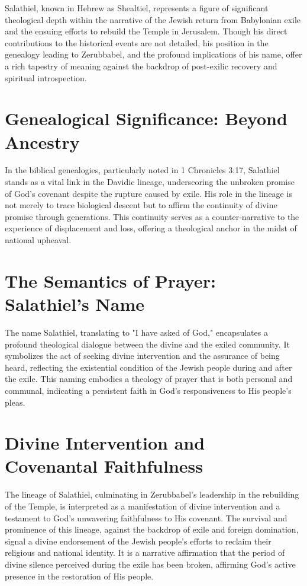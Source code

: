 Salathiel, known in Hebrew as Shealtiel, represents a figure of significant theological depth within the narrative of the Jewish return from Babylonian exile and the ensuing efforts to rebuild the Temple in Jerusalem. Though his direct contributions to the historical events are not detailed, his position in the genealogy leading to Zerubbabel, and the profound implications of his name, offer a rich tapestry of meaning against the backdrop of post-exilic recovery and spiritual introspection.

\chapter{Genealogical Significance: Beyond Ancestry}
In the biblical genealogies, particularly noted in 1 Chronicles 3:17, Salathiel stands as a vital link in the Davidic lineage, underscoring the unbroken promise of God’s covenant despite the rupture caused by exile. His role in the lineage is not merely to trace biological descent but to affirm the continuity of divine promise through generations. This continuity serves as a counter-narrative to the experience of displacement and loss, offering a theological anchor in the midst of national upheaval.

\chapter{The Semantics of Prayer: Salathiel's Name}
The name Salathiel, translating to "I have asked of God," encapsulates a profound theological dialogue between the divine and the exiled community. It symbolizes the act of seeking divine intervention and the assurance of being heard, reflecting the existential condition of the Jewish people during and after the exile. This naming embodies a theology of prayer that is both personal and communal, indicating a persistent faith in God's responsiveness to His people’s pleas.

\chapter{Divine Intervention and Covenantal Faithfulness}
The lineage of Salathiel, culminating in Zerubbabel’s leadership in the rebuilding of the Temple, is interpreted as a manifestation of divine intervention and a testament to God’s unwavering faithfulness to His covenant. The survival and prominence of this lineage, against the backdrop of exile and foreign domination, signal a divine endorsement of the Jewish people’s efforts to reclaim their religious and national identity. It is a narrative affirmation that the period of divine silence perceived during the exile has been broken, affirming God's active presence in the restoration of His people.

